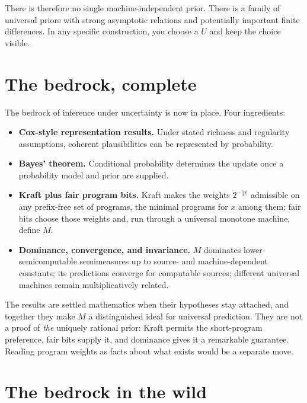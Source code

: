 There is therefore no single machine-independent prior. There is a family of universal priors with strong asymptotic relations and potentially important finite differences. In any specific construction, you choose a $U$ and keep the choice visible.

\section*{The bedrock, complete}

The bedrock of inference under uncertainty is now in place. Four ingredients:

\begin{itemize}
\item \textbf{Cox-style representation results.} Under stated richness and regularity assumptions, coherent plausibilities can be represented by probability.
\item \textbf{Bayes' theorem.} Conditional probability determines the update once a probability model and prior are supplied.
\item \textbf{Kraft plus fair program bits.} Kraft makes the weights $2^{-|p|}$ admissible on any prefix-free set of programs, the minimal programs for $x$ among them; fair bits choose those weights and, run through a universal monotone machine, define $M$.
\item \textbf{Dominance, convergence, and invariance.} $M$ dominates lower-semicomputable semimeasures up to source- and machine-dependent constants; its predictions converge for computable sources; different universal machines remain multiplicatively related.
\end{itemize}

The results are settled mathematics when their hypotheses stay attached, and together they make $M$ a distinguished ideal for universal prediction. They are not a proof of \emph{the} uniquely rational prior: Kraft permits the short-program preference, fair bits supply it, and dominance gives it a remarkable guarantee. Reading program weights as facts about what exists would be a separate move.

\section*{The bedrock in the wild}

